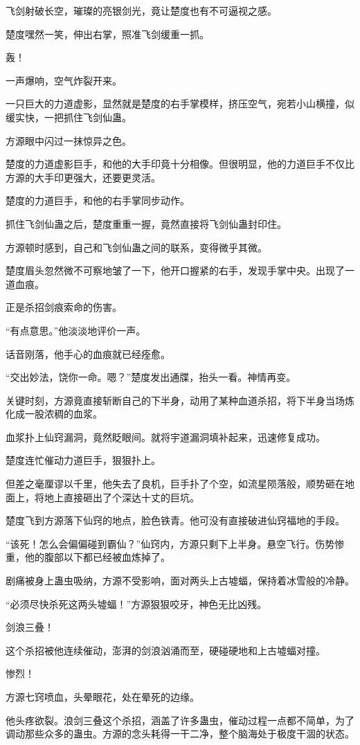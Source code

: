\begin{this_body}
飞剑射破长空，璀璨的亮银剑光，竟让楚度也有不可逼视之感。

楚度嘿然一笑，伸出右掌，照准飞剑缓重一抓。

轰！

一声爆响，空气炸裂开来。

一只巨大的力道虚影，显然就是楚度的右手掌模样，挤压空气，宛若小山横撞，似缓实快，一把抓住飞剑仙蛊。

方源眼中闪过一抹惊异之色。

楚度的力道虚影巨手，和他的大手印竟十分相像。但很明显，他的力道巨手不仅比方源的大手印更强大，还要更灵活。

楚度的力道巨手，和他的右手掌同步动作。

抓住飞剑仙蛊之后，楚度重重一握，竟然直接将飞剑仙蛊封印住。

方源顿时感到，自己和飞剑仙蛊之间的联系，变得微乎其微。

楚度眉头忽然微不可察地皱了一下，他开口握紧的右手，发现手掌中央。出现了一道血痕。

正是杀招剑痕索命的伤害。

“有点意思。”他淡淡地评价一声。

话音刚落，他手心的血痕就已经痊愈。

“交出妙法，饶你一命。嗯？”楚度发出通牒，抬头一看。神情再变。

关键时刻，方源竟直接斩断自己的下半身，动用了某种血道杀招，将下半身当场炼化成一股浓稠的血浆。

血浆扑上仙窍漏洞，竟然眨眼间。就将宇道漏洞填补起来，迅速修复成功。

楚度连忙催动力道巨手，狠狠扑上。

但差之毫厘谬以千里，他失去了良机，巨手扑了个空，如流星陨落般，顺势砸在地面上，将地上直接砸出了个深达十丈的巨坑。

楚度飞到方源落下仙窍的地点，脸色铁青。他可没有直接破进仙窍福地的手段。

“该死！怎么会偏偏碰到霸仙？”仙窍内，方源只剩下上半身。悬空飞行。伤势惨重，他的腹部以下都已经被血炼掉了。

剧痛被身上蛊虫吸纳，方源不受影响，面对两头上古墟蝠，保持着冰雪般的冷静。

“必须尽快杀死这两头墟蝠！”方源狠狠咬牙，神色无比凶残。

剑浪三叠！

这个杀招被他连续催动，澎湃的剑浪汹涌而至，硬碰硬地和上古墟蝠对撞。

惨烈！

方源七窍喷血，头晕眼花，处在晕死的边缘。

他头疼欲裂。浪剑三叠这个杀招，涵盖了许多蛊虫，催动过程一点都不简单，为了调动那些众多的蛊虫。方源的念头耗得一干二净，整个脑海处于极度干涸的状态。


\end{this_body}

